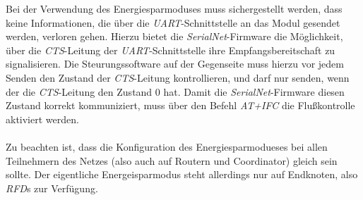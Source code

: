         Bei der Verwendung des Energiesparmoduses muss sichergestellt werden, dass keine Informationen,
        die über die \emph{UART}-Schnittstelle an das Modul gesendet werden, verloren gehen. Hierzu 
        bietet die \emph{SerialNet}-Firmware die Möglichkeit, über die \emph{CTS}-Leitung der 
        \emph{UART}-Schnittstelle ihre Empfangsbereitschaft zu signalisieren. Die Steurungssoftware
        auf der Gegenseite muss hierzu vor jedem Senden den Zustand der \emph{CTS}-Leitung
        kontrollieren, und darf nur senden, wenn der die \emph{CTS}-Leitung den Zustand 0 hat. Damit die
        \emph{SerialNet}-Firmware diesen Zustand korrekt kommuniziert, muss über den Befehl \emph{AT+IFC}
        die Flußkontrolle aktiviert werden. \\
        \\
        Zu beachten ist, dass die Konfiguration des Energiesparmodueses bei allen Teilnehmern des Netzes
        (also auch auf Routern und Coordinator) gleich sein sollte. Der eigentliche Energeisparmodus steht
        allerdings nur auf Endknoten, also \emph{RFD}s zur Verfügung.
